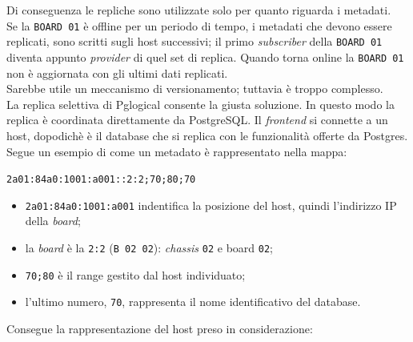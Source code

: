 Di conseguenza le repliche sono utilizzate solo per quanto riguarda i metadati. \\
Se la \verb"BOARD 01" \`{e} offline per un periodo di tempo, i metadati che devono essere replicati, sono scritti sugli host successivi; il primo \textit{subscriber} della \verb"BOARD 01" diventa appunto \textit{provider} di quel set di replica. Quando torna online la \verb"BOARD 01" non \`{e} aggiornata con gli ultimi dati replicati.\\
Sarebbe utile un meccanismo di versionamento; tuttavia \`{e} troppo complesso. \\
La replica selettiva di Pglogical consente la giusta soluzione. In questo modo la replica \`{e} coordinata direttamente da PostgreSQL. Il \textit{frontend} si connette a un host, dopodich\`{e} \`{e} il database che si replica con le funzionalit\`{a} offerte da Postgres.\\
Segue un esempio di come un metadato \`{e} rappresentato nella mappa:

\begin{center}
\verb"2a01:84a0:1001:a001::2:2;70;80;70"
\end{center}

\begin{itemize}
\item 
\verb"2a01:84a0:1001:a001" indentifica la posizione del host, quindi l'indirizzo IP della \textit{board};
\item 
la \textit{board} \`{e} la \verb"2:2" (\verb"B 02 02"): \textit{chassis} \verb"02" e board \verb"02";
\item
\verb"70;80" \`{e} il range gestito dal host individuato;
\item
l'ultimo numero, \verb"70", rappresenta il nome identificativo del database.
\end{itemize}

Consegue la rappresentazione del host preso in considerazione:

